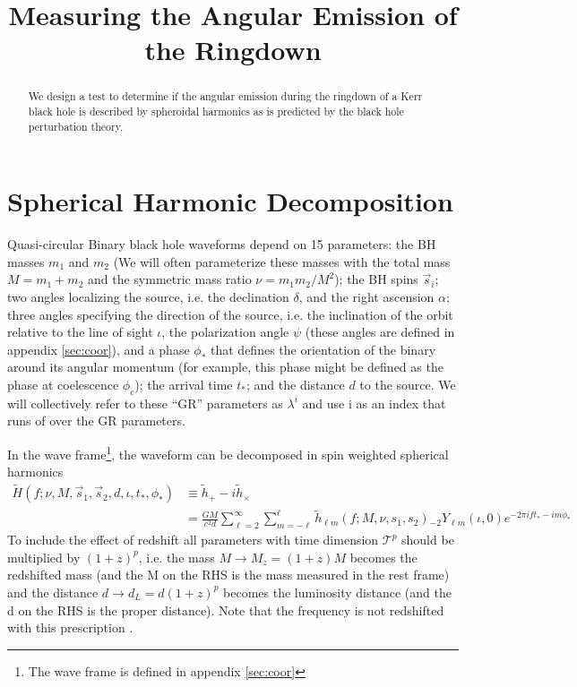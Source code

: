 \documentclass[aps,prd,amsmath,showpacs,amssymb,superscriptaddress,nofootinbib,longbibliography,eqsecnum,preprintnumbers]{revtex4-1}
\newcommand{\Ys}{{}_{-2}Y_{\ell m}}
\newcommand{\Caltech}{\affiliation{Theoretical Astrophysics 350-17, California Institute of Technology, Pasadena, CA 91125}}
\begin{document}
\title{Measuring the Angular Emission of the Ringdown}
\begin{abstract}
We design a test to determine if the angular emission during the ringdown of a Kerr black hole is described by spheroidal harmonics as is predicted by the black hole perturbation theory. 
\end{abstract}
\maketitle
\tableofcontents

\section{Spherical Harmonic Decomposition}

Quasi-circular Binary black hole waveforms depend on 15 parameters: the BH masses $m_1$ and $m_2$ (We will often parameterize these masses with the total mass $M=m_1+m_2$ and the symmetric mass ratio $\nu =m_1m_2/M^2$); the BH spins $\vec s_i$; two angles localizing the source, i.e. the declination $\delta$, and the right ascension $\alpha$; three angles specifying the direction of the source, i.e. the inclination of the orbit relative to the line of sight $\iota$, the polarization angle $\psi$ (these angles are defined in appendix \ref{sec:coor}), and a phase $\phi_*$ that defines the orientation of the binary around its angular momentum (for example, this phase might be defined as the phase at coelescence $\phi_c$); the arrival time $t_*$; and the distance $d$ to the source. We will collectively refer to these ``GR'' parameters as $\lambda^i$ and use i as an index that runs of over the GR parameters. 

In the wave frame\footnote{The wave frame is defined in appendix \ref{sec:coor}}, the waveform can be decomposed in spin weighted spherical harmonics
\begin{align}
\tilde H(f;\nu,M,\vec s_1,\vec s_2, d,\iota,t_*,\phi_*)
&\equiv \tilde h_+-i\tilde h_\times \nonumber \\
&=\frac{GM}{c^2d}\sum_{\ell =2}^\infty \sum_{m=-\ell}^\ell \tilde h_{\ell m}\left(f;M, \nu, s_1,s_2\right)\Ys(\iota, 0)e^{-2\pi i f t_* -im\phi_*} \label{eq:dec}
\end{align}
To include the effect of redshift all parameters with time dimension $\mathcal{T}^p$ should be multiplied by $(1+z)^p$, i.e. the mass $M\to M_z=(1+z)M$ becomes the redshifted mass (and the M on the RHS is the mass measured in the rest frame) and the distance $d\to d_L=d(1+z)^p$ becomes the luminosity distance (and the d on the RHS is the proper distance). Note that the frequency is not redshifted with this prescription \cite{Berti:2005ys}.
\end{document}
